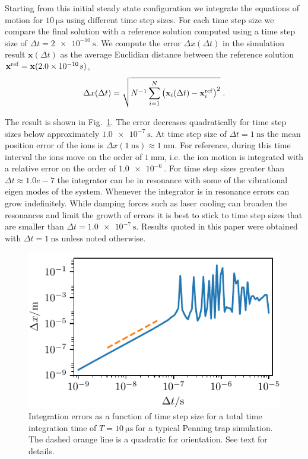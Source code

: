 \documentclass[aps, pra, twocolumn]{revtex4-1}
\begin{document}
Starting from this initial steady state configuration we
integrate the equations of motion for $\SI{10}{\us}$ using
different time step sizes. For each time step size we compare the
final solution with a reference solution computed using a time
step size of $\Delta t = \SI{2e-10}{\second}$. We compute the
error $\Delta x(\Delta t)$ in the simulation result
$\mathbf{x}(\Delta t)$ as the average Euclidian distance between
the reference solution $\mathbf{x}^{\rm
  ref}=\mathbf{x}(\SI{2.0e-10}{\second})$,
\begin{equation}
  \Delta x(\Delta t) =
  \sqrt{N^{-1}\sum_{i=1}^N\left(
      \mathbf{x}_i(\Delta t)-\mathbf{x}_i^{\rm ref}\right)^2}\;.
\end{equation}

The result is shown in Fig.~\ref{fig:convergence}. The error
decreases quadratically for time step sizes below approximately
$\SI{1.0e-7}{\second}$. At time step size of $\Delta t =
\SI{1}{\nano\second}$ the mean position error of the ions is
$\Delta x(\SI{1}{\nano\second})\approx \SI{1}{\nano\meter}$. For
reference, during this time interval the ions move on the order
of $\SI{1}{\milli\meter}$, i.e. the ion motion is integrated with
a relative error on the order of $\SI{1.0e-6}{}$. For time step
sizes greater than $\Delta t\approx 1.0e-7$ the integrator can be in
resonance with some of the vibrational eigen modes of the system.
Whenever the integrator is in resonance errors can grow
indefinitely. While damping forces such as laser cooling can
broaden the resonances and limit the growth of errors it is best
to stick to time step sizes that are smaller than $\Delta t =
\SI{1.0e-7}{\second}$. Results quoted in this paper were obtained
with $\Delta t = \SI{1}{\nano\second}$ unless noted otherwise.
\begin{figure}
  \includegraphics{./figures/fig_convergence.pdf}
  \caption{Integration errors as a function of time step size for
    a total time integration time of $T=\SI{10}{\us}$ for a
    typical Penning trap simulation. The dashed orange line is a
    quadratic for orientation. See text for details.}
  \label{fig:convergence}
\end{figure}
\end{document}
